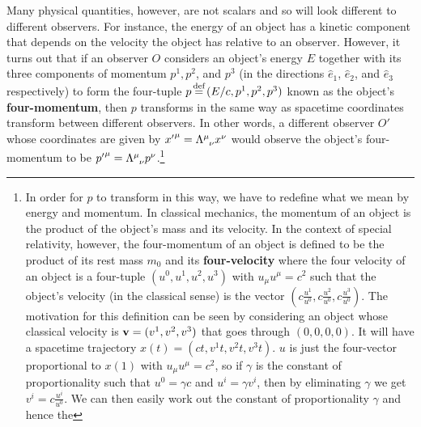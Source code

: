 Many physical quantities, however, are not scalars and so will look different to different observers. For instance, the energy of an object has a kinetic component that depends on the velocity the object has relative to an observer. However, it turns out that if an observer $O$ considers an object's energy $E$ together with its three components of momentum $p^1, p^2$, and $p^3$ (in the directions $\hat{e}_1$, $\hat{e}_2$, and $\hat{e}_3$ respectively) to form the four-tuple $p\myeq(E/c, p^1, p^2, p^3)$ known as the object's \textbf{four-momentum}, then $p$ transforms in the same way as spacetime coordinates transform between different observers. In other words, a different observer $O'$ whose coordinates are given by ${x'}^\mu=\Lambda\indices{^\mu_\nu}x^\nu$ would observe the object's four-momentum to be ${p'}^\mu=\Lambda\indices{^\mu_\nu}p^\nu$.\footnote{In order for $p$ to transform in this way, we have to redefine what we mean by energy and momentum. In classical mechanics, the momentum of an object is the product of the object's mass and its velocity. In the context of special relativity, however, the four-momentum of an object is defined to be the product of its rest mass $m_0$ and its \textbf{four-velocity} where the four velocity of an object is a four-tuple $(u^0, u^1, u^2, u^3)$ with $u_\mu u^\mu=c^2$ such that the object's velocity (in the classical sense) is the vector $(c \frac{u^1}{u^0}, c \frac{u^2}{u^0}, c\frac{u^3}{u^0})$. The motivation for this definition can be seen by considering an object whose classical velocity is $\vb{v}=(v^1,v^2,v^3)$ that goes through $(0,0,0,0)$. It will have a spacetime trajectory $x(t)=(ct, v^1 t, v^2 t, v^3 t)$. $u$ is just the four-vector proportional to $x(1)$ with $u_\mu u^\mu=c^2$, so if $\gamma$ is the constant of proportionality such that $u^0=\gamma c$ and $u^i=\gamma v^i$, then by eliminating $\gamma$ we get $v^i=c\frac{u^i}{u^0}$.  We can then easily work out the constant of proportionality $\gamma$ and hence the
}
